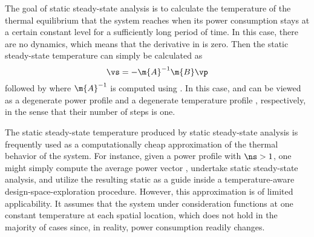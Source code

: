 The goal of static steady-state analysis is to calculate the temperature of the
thermal equilibrium that the system reaches when its power consumption stays at
a certain constant level \vp for a sufficiently long period of time. In this
case, there are no dynamics, which means that the derivative in
 is zero. Then the static steady-state
temperature \vq can simply be calculated as
\[
  \vs = -\m{A}^{-1} \m{B} \vp
\]
followed by  where $\m{A}^{-1}$ is computed using
. In this case, \vp and \vq can be viewed as a degenerate
power profile \mp and a degenerate temperature profile \mq, respectively, in the
sense that their number of steps \ns is one.

The static steady-state temperature produced by static steady-state analysis is
frequently used as a computationally cheap approximation of the thermal behavior
of the system. For instance, given a power profile \mp with $\ns > 1$, one might
simply compute the average power vector \vp, undertake static steady-state
analysis, and utilize the resulting static \vq as a guide inside a
temperature-aware design-space-exploration procedure. However, this
approximation is of limited applicability. It assumes that the system under
consideration functions at one constant temperature at each spatial location,
which does not hold in the majority of cases since, in reality, power
consumption readily changes.
